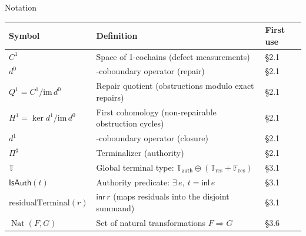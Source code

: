 \documentclass[
  10pt,
]{article}
\begin{document}
Notation

\begin{longtable}[]{@{}
  >{\raggedright\arraybackslash}p{}
  >{\raggedright\arraybackslash}p{}
  >{\raggedright\arraybackslash}p{}@{}}
\toprule\noalign{}
\begin{minipage}[b]{\linewidth}\raggedright
Symbol
\end{minipage} & \begin{minipage}[b]{\linewidth}\raggedright
Definition
\end{minipage} & \begin{minipage}[b]{\linewidth}\raggedright
First use
\end{minipage} \\
\midrule\noalign{}
\endhead
\bottomrule\noalign{}
\endlastfoot
\protect\hypertarget{math-E0012-0131}{}{\(C^1\)} & Space of 1-cochains (defect measurements) & §2.1 \\
\protect\hypertarget{math-E0014-0132}{}{\(d^0\)} & 0-coboundary operator (repair) & §2.1 \\
\protect\hypertarget{math-E0086-0133}{}{\(Q^1 = C^1 / \mathrm{im}\,d^0\)} & Repair quotient (obstructions modulo exact repairs) & §2.1 \\
\protect\hypertarget{math-E0087-0134}{}{\(H^1 = \ker d^1 / \mathrm{im}\,d^0\)} & First cohomology (non-repairable obstruction cycles) & §2.1 \\
\protect\hypertarget{math-E0018-0135}{}{\(d^1\)} & 1-coboundary operator (closure) & §2.1 \\
\protect\hypertarget{math-E0022-0136}{}{\(\Pi^\sharp\)} & Terminalizer (authority) & §2.1 \\
\protect\hypertarget{math-E0045-0137}{}{\(\mathbb{T}\)} & Global terminal type: \protect\hypertarget{math-E0088-0138}{}{\(\mathbb{T}_{\mathsf{auth}} \oplus (\mathbb{T}_{\mathrm{res}} + \mathbb{F}_{\mathrm{res}})\)} & §3.1 \\
\protect\hypertarget{math-E0058-0139}{}{\(\mathsf{IsAuth}(t)\)} & Authority predicate: \protect\hypertarget{math-E0089-0140}{}{\(\exists\,e,\ t = \mathsf{inl}\,e\)} & §3.1 \\
\protect\hypertarget{math-E0051-0141}{}{\(\mathrm{residualTerminal}(r)\)} & \protect\hypertarget{math-E0052-0142}{}{\(\mathsf{inr}\,r\)} (maps residuals into the disjoint summand) & §3.1 \\
\protect\hypertarget{math-E0090-0143}{}{\(\operatorname{Nat}(F, G)\)} & Set of natural transformations \protect\hypertarget{math-E0091-0144}{}{\(F \Rightarrow G\)} & §3.6 \\

\end{longtable}
\end{document}
